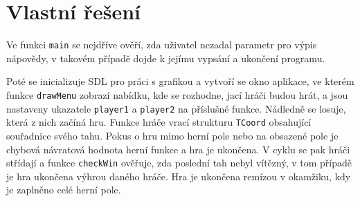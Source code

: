 \documentclass[a4paper,11pt,titlepage]{article}
\begin{document}

\newpage

\section{Vlastní řešení}

Ve funkci {\tt main} se nejdříve ověří, zda uživatel nezadal parametr pro výpis nápovědy, v takovém případě dojde k jejímu vypsání a ukončení programu.

Poté se inicializuje SDL pro práci s grafikou a vytvoří se okno aplikace, ve kterém funkce {\tt drawMenu} zobrazí nabídku, kde se rozhodne, jací hráči budou hrát, a jsou nastaveny ukazatele {\tt player1} a {\tt player2} na příslušné funkce. Nádledně se losuje, která z nich začíná hru. Funkce hráče vrací strukturu {\tt TCoord} obsahující souřadnice svého tahu. Pokus o hru mimo herní pole nebo na obsazené pole je chybová návratová hodnota herní funkce a hra je ukončena. V cyklu se pak hráči střídají a funkce {\tt checkWin} ověřuje, zda poslední tah nebyl vítězný, v tom případě je hra ukončena výhrou daného hráče. Hra je ukončena remízou v okamžiku, kdy je zaplněno celé herní pole.
\end{document}
